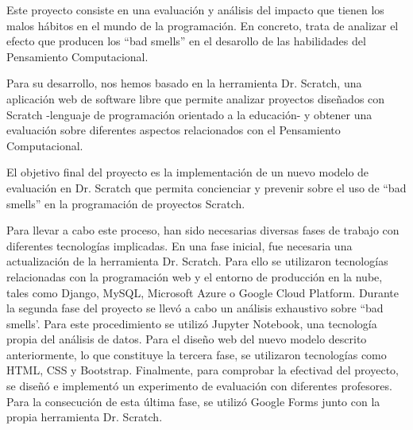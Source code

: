 Este proyecto consiste en una evaluación y análisis del impacto que tienen los malos hábitos en el mundo de la programación. En concreto, trata de analizar el efecto que producen los ``bad smells'' en el desarollo de las habilidades del Pensamiento Computacional.  

Para su desarrollo, nos hemos basado en la herramienta Dr. Scratch, una aplicación web de software libre que permite analizar proyectos diseñados con Scratch -lenguaje de programación orientado a la educación- y obtener una evaluación sobre diferentes aspectos relacionados con el Pensamiento Computacional.

El objetivo final del proyecto es la implementación de un nuevo modelo de evaluación en Dr. Scratch que permita concienciar y prevenir sobre el uso de ``bad smells'' en la programación de proyectos Scratch. 

Para llevar a cabo este proceso, han sido necesarias diversas fases de trabajo con diferentes tecnologías implicadas. En una fase inicial, fue necesaria una actualización de la herramienta Dr. Scratch. Para ello se utilizaron tecnologías relacionadas con la programación web y el entorno de producción en la nube, tales como Django, MySQL, Microsoft Azure o Google Cloud Platform. Durante la segunda fase del proyecto se llevó a cabo un análisis exhaustivo sobre ``bad smells'. Para este procedimiento se utilizó Jupyter Notebook, una tecnología propia del análisis de datos. Para el diseño web del nuevo modelo descrito anteriormente, lo que constituye la tercera fase, se utilizaron tecnologías como HTML, CSS y Bootstrap. Finalmente, para comprobar la efectivad del proyecto, se diseñó e implementó un experimento de evaluación con diferentes profesores. Para la consecución de esta última fase, se utilizó Google Forms junto con la propia herramienta Dr. Scratch.
